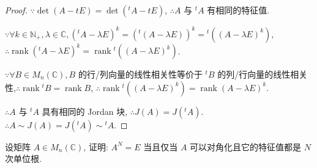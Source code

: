 \documentclass{ctexart}
\begin{document}
\begin{proof}
    $\because\det(A-tE)=\det({}^tA-tE)$, $\therefore A$ 与 $^tA$ 有相同的特征值.

    $\because\forall k\in\mathbb{N}_+,\lambda\in\mathbb{C},({}^tA-\lambda E)^k=({}^t(A-\lambda E))^k={}^t((A-\lambda E)^k)$, $\therefore\operatorname{rank}({}^tA-\lambda E)^k=\operatorname{rank}{}^t((A-\lambda E)^k)$.
    
    $\because\forall B\in M_n(\mathbb{C}),B$ 的行/列向量的线性相关性等价于 $^tB$ 的列/行向量的线性相关性,$\therefore\operatorname{rank}{}^tB=\operatorname{rank}B$, $\therefore\operatorname{rank}{}^t((A-\lambda E)^k)=\operatorname{rank}(A-\lambda E)^k$.
    
    $\therefore A$ 与 $^tA$ 具有相同的 Jordan 块, $\therefore J(A)=J({}^tA)$. $\therefore A\sim J(A)=J({}^tA)\sim{}^tA$.
\end{proof}
\begin{exercise}%
    设矩阵 $A\in M_n(\mathbb{C})$, 证明: $A^N=E$ 当且仅当 $A$ 可以对角化且它的特征值都是 $N$ 次单位根.
\end{exercise}
\end{document}
